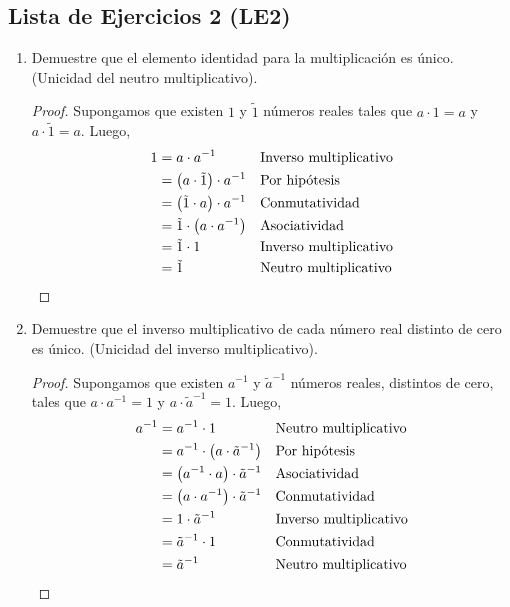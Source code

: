 \documentclass[11pt]{article}
\begin{document}
\subsection*{Lista de Ejercicios 2 (LE2)}
    \begin{enumerate}[label=\alph*)]
    \item Demuestre que el elemento identidad para la multiplicación es único. (Unicidad del neutro multiplicativo).
    
    \vspace{-1em}\begin{proof} 
        Supongamos que existen $1$ y $\tilde{1}$ números reales tales que $a\cdot 1=a$ y $a\cdot\tilde{1}=a$. Luego,
    \begin{align*}
    1 &= a \cdot a^{-1} && \text{Inverso multiplicativo}\\
    &= \left( a \cdot \tilde{1} \right) \cdot a^{-1} && \text{Por hipótesis}\\
    &= \left( \tilde{1} \cdot a \right) \cdot a^{-1} && \text{Conmutatividad}\\
    &= \tilde{1} \cdot \left( a \cdot a^{-1} \right) && \text{Asociatividad}\\
    &= \tilde{1} \cdot 1 && \text{Inverso multiplicativo}\\
    &= \tilde{1} && \text{Neutro multiplicativo}\qedhere
    \end{align*}     
    \end{proof} \vspace{-1em}
    
    \item Demuestre que el inverso multiplicativo de cada número real distinto de cero es único. (Unicidad del inverso multiplicativo).
    
    \vspace{-1em}\begin{proof} Supongamos que existen $a^{-1}$ y $\tilde{a}^{-1}$ números reales, distintos de cero, tales que $a \cdot a^{-1} = 1$ y $a \cdot \tilde{a}^{-1} = 1$. Luego,
        \begin{align*}
            a^{-1} &= a^{-1} \cdot 1 && \text{Neutro multiplicativo} \\
            &= a^{-1} \cdot \left(a \cdot \tilde{a}^{-1} \right) && \text{Por hipótesis} \\
            &= \left( a^{-1} \cdot a \right) \cdot \tilde{a} ^{-1} && \text{Asociatividad} \\
            &= \left(a \cdot a^{-1} \right) \cdot \tilde{a}^{-1} && \text{Conmutatividad} \\
            &= 1 \cdot \tilde{a}^{-1} && \text{Inverso multiplicativo} \\
            &= \tilde{a}^{-1} \cdot 1 && \text{Conmutatividad} \\
            &= \tilde{a}^{-1} && \text{Neutro multiplicativo}\qedhere
            \end{align*}     
    \end{proof} \vspace{-1em}
    

\end{enumerate}
\end{document}
